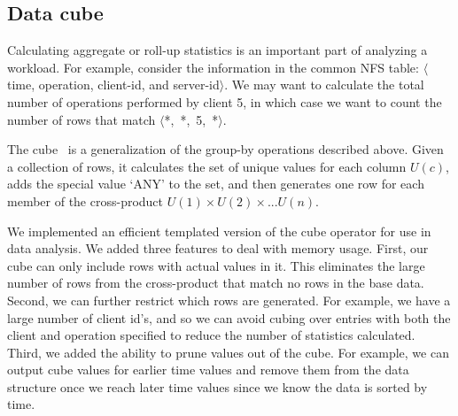 
\subsection{Data cube}

Calculating aggregate or roll-up statistics is an important part of
analyzing a workload.  For example, consider the information in the
common NFS table: $\langle$time, operation, client-id, and
server-id$\rangle$.  We may want to calculate the total number of
operations performed by client 5, in which case we want to count the
number of rows that match \mbox{$\langle$*, *, 5, *$\rangle$}.

The cube~\cite{gray97cube} is a generalization of the group-by
operations described above.  Given a collection of rows, it calculates
the set of unique values for each column $U(c)$, adds the special
value `ANY' to the set, and then generates one row for each member of
the cross-product $U(1) \times U(2) \times ... U(n)$.

We implemented an efficient templated version of the cube operator for
use in data analysis.  We added three features to deal with memory
usage.  First, our cube can only include rows with actual values in
it.  This eliminates the large number of rows from the cross-product
that match no rows in the base data.  Second, we can further restrict
which rows are generated.  For example, we have a large number of
client id's, and so we can avoid cubing over entries with both the client
and operation specified to reduce the number of statistics
calculated.  Third, we added the ability to prune values out of the
cube. For example, we can output cube values for earlier time values
and remove them from the data structure once we reach later time
values since we know the data is sorted by time.

